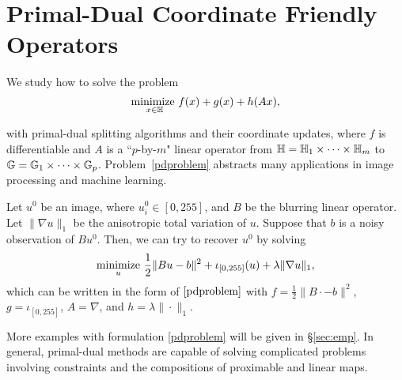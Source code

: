 \section{Primal-Dual Coordinate Friendly Operators}\label{sec:p-d}
{We study how to solve the  problem
\begin{equation}
\underset{x\in\mathbb{H}}{\text{\normalfont minimize }} f(x)+g(x)+h(Ax),\label{pdproblem}
\end{equation}
{with primal-dual splitting algorithms and their coordinate updates, where $f$ is differentiable %
and $A$ is a ``$p$-by-$m$" linear operator from $\mathbb{H}=\mathbb{H}_1\times\cdots\times\mathbb{H}_m$ to $\mathbb{G}=\mathbb{G}_1\times\cdots\times\mathbb{G}_p$.
 Problem~\eqref{pdproblem} abstracts many applications in image processing and machine learning.
\begin{example}
Let $u^0$ be an image, where $u_i^0\in[0,255]$, and $B$ be the blurring linear operator. Let $\|\nabla u\|_1$ be the anisotropic total variation of $u$. Suppose that $b$ is a noisy observation of $Bu^0$. Then, we can try to recover $u^0$ by solving 
\begin{equation}
\Min_u\, \frac{1}{2}\|Bu-b\|^2+\iota_{[0,255]}(u)+\lambda\|\nabla u\|_1,
\end{equation}
which can be written in the form of $\eqref{pdproblem}$ with $f=\frac{1}{2}\|B\cdot-b\|^2$, $g=\iota_{[0,255]}$, $A=\nabla$, and $h=\lambda\|\cdot\|_{1}$.
\end{example}
More examples with formulation \eqref{pdproblem} will be given in \S\ref{sec:emp}. %
In general, primal-dual methods are capable of solving complicated problems involving constraints and the compositions of proximable and linear maps.

}}
